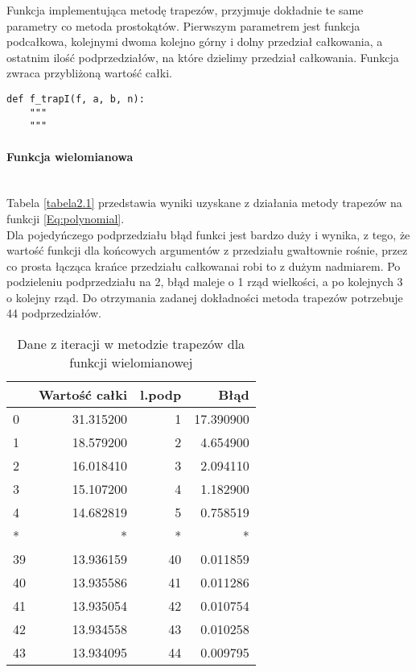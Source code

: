 \documentclass[12pt,twoside]{article}
\begin{document}
Funkcja implementująca metodę trapezów, przyjmuje dokładnie te same parametry co metoda prostokątów. Pierwszym parametrem jest funkcja podcałkowa, kolejnymi dwoma kolejno górny i dolny przedział całkowania, a ostatnim  ilość podprzedziałów, na które dzielimy przedział całkowania. Funkcja zwraca przybliżoną wartość całki.

\begin{lstlisting}[caption={Kod w języku python implementujący metodę trapezów}]
def f_trapI(f, a, b, n):
    """
    """
\end{lstlisting}
\label{Listing 7}

\paragraph{Funkcja wielomianowa}\mbox{} \\

Tabela \eqref{tabela2.1} przedstawia wyniki uzyskane z działania metody trapezów na funkcji \eqref{Eq:polynomial}.\\
Dla pojedyńczego podprzedziału błąd funkci jest bardzo duży i wynika, z tego, że wartość funkcji dla końcowych argumentów z przedziału gwałtownie rośnie, przez co prosta łącząca krańce przedziału całkowanai robi to z dużym nadmiarem. Po podzieleniu podprzedziału na 2, błąd maleje o 1 rząd wielkości, a po kolejnych 3 o kolejny rząd. Do otrzymania zadanej dokładności metoda trapezów potrzebuje 44 podprzedziałów.
\begin{table}[ht]
\centering 
\caption{Dane z iteracji w metodzie trapezów dla funkcji wielomianowej}
\label{tabela2.1}
\begin{tabular}{lrrr}
\toprule
{} &  Wartość całki &  l.podp &       Błąd \\
\midrule
0  &      31.315200 &       1 &  17.390900 \\
1  &      18.579200 &       2 &   4.654900 \\
2  &      16.018410 &       3 &   2.094110 \\
3  &      15.107200 &       4 &   1.182900 \\
4  &      14.682819 &       5 &   0.758519 \\
* &      * &      * &   * \\
39 &      13.936159 &      40 &   0.011859 \\
40 &      13.935586 &      41 &   0.011286 \\
41 &      13.935054 &      42 &   0.010754 \\
42 &      13.934558 &      43 &   0.010258 \\
43 &      13.934095 &      44 &   0.009795 \\
\bottomrule
\end{tabular}
\end{table}
\end{document}
